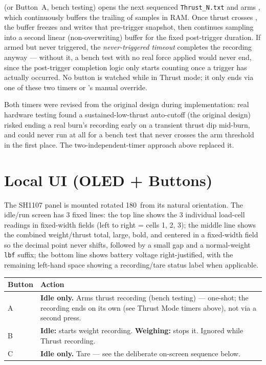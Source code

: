﻿\documentclass[11pt,letterpaper]{article}
\begin{document}
\begin{sloppypar}
 (or Button~A, bench testing) opens the
next sequenced \texttt{Thrust\_N.txt} and arms , which
continuously buffers the trailing  of samples
in RAM. Once thrust crosses , the buffer
freezes and writes that pre-trigger snapshot, then continues sampling into
a second linear (non-overwriting) buffer for the fixed post-trigger
duration. If armed but never triggered, the \emph{never-triggered timeout}
completes the recording anyway --- without it, a bench test with no real
force applied would never end, since the post-trigger completion logic
only starts counting once a trigger has actually occurred. No button is
watched while in Thrust mode; it only ends via one of these two timers or
's manual override.
\end{sloppypar}

Both timers were revised from the original design during implementation:
real hardware testing found a sustained-low-thrust auto-cutoff (the
original design) risked ending a real burn's recording early on a
transient thrust dip mid-burn, and could never run at all for a bench
test that never crosses the arm threshold in the first place. The
two-independent-timer approach above replaced it.

\section{Local UI (OLED + Buttons)}

The SH1107 panel is mounted rotated 180\textdegree\ from its natural
orientation. The idle/run screen has 3 fixed lines: the top line shows
the 3 individual load-cell readings in fixed-width fields (left to right
= cells 1, 2, 3); the middle line shows the combined weight/thrust total,
large, bold, and centered in a fixed-width field so the decimal point
never shifts, followed by a small gap and a normal-weight \texttt{lbf}
suffix; the bottom line shows battery voltage right-justified, with the
remaining left-hand space showing a recording/tare status label when
applicable.

\begin{center}
\begin{tabularx}{\textwidth}{@{}lY@{}}
\toprule
Button & Action \\
\midrule
A & \textbf{Idle only.} Arms thrust recording (bench testing) --- one-shot; the recording ends on its own (see Thrust Mode timers above), not via a second press. \\
B & \textbf{Idle:} starts weight recording. \textbf{Weighing:} stops it. Ignored while Thrust recording. \\
C & \textbf{Idle only.} Tare --- see the deliberate on-screen sequence below. \\
\bottomrule
\end{tabularx}
\end{center}
\end{document}
